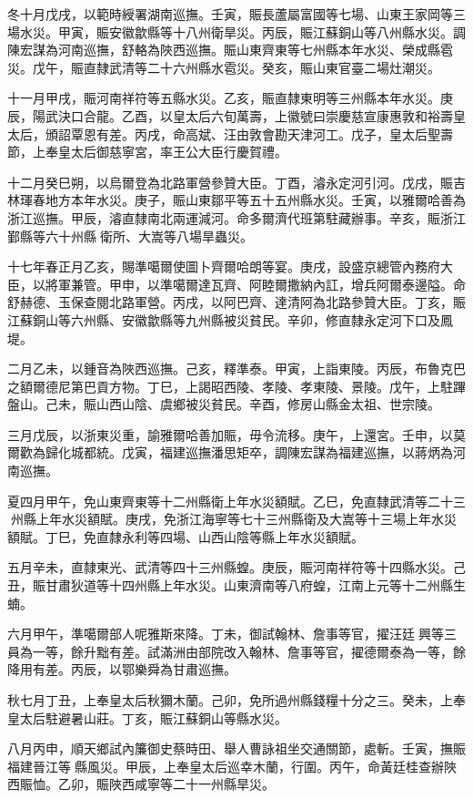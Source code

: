 \begin{pinyinscope}
冬十月戊戌，以範時綬署湖南巡撫。壬寅，賑長蘆屬富國等七場、山東王家岡等三場水災。甲寅，賑安徽歙縣等十八州衛旱災。丙辰，賑江蘇銅山等八州縣水災。調陳宏謀為河南巡撫，舒輅為陜西巡撫。賑山東齊東等七州縣本年水災、榮成縣雹災。戊午，賑直隸武清等二十六州縣水雹災。癸亥，賑山東官臺二場灶潮災。

十一月甲戌，賑河南祥符等五縣水災。乙亥，賑直隸東明等三州縣本年水災。庚辰，陽武決口合龍。乙酉，以皇太后六旬萬壽，上徽號曰崇慶慈宣康惠敦和裕壽皇太后，頒詔覃恩有差。丙戌，命高斌、汪由敦會勘天津河工。戊子，皇太后聖壽節，上奉皇太后御慈寧宮，率王公大臣行慶賀禮。

十二月癸巳朔，以烏爾登為北路軍營參贊大臣。丁酉，濬永定河引河。戊戌，賑吉林琿春地方本年水災。庚子，賑山東鄒平等五十五州縣水災。壬寅，以雅爾哈善為浙江巡撫。甲辰，濬直隸南北兩運減河。命多爾濟代班第駐藏辦事。辛亥，賑浙江鄞縣等六十州縣衛所、大嵩等八場旱蟲災。

十七年春正月乙亥，賜準噶爾使圖卜齊爾哈朗等宴。庚戌，設盛京總管內務府大臣，以將軍兼管。甲申，以準噶爾達瓦齊、阿睦爾撒納內訌，增兵阿爾泰邊隘。命舒赫德、玉保查閱北路軍營。丙戌，以阿巴齊、達清阿為北路參贊大臣。丁亥，賑江蘇銅山等六州縣、安徽歙縣等九州縣被災貧民。辛卯，修直隸永定河下口及鳳堤。

二月乙未，以鍾音為陜西巡撫。己亥，釋準泰。甲寅，上詣東陵。丙辰，布魯克巴之額爾德尼第巴貢方物。丁巳，上謁昭西陵、孝陵、孝東陵、景陵。戊午，上駐蹕盤山。己未，賑山西山陰、虞鄉被災貧民。辛酉，修房山縣金太祖、世宗陵。

三月戊辰，以浙東災重，諭雅爾哈善加賑，毋令流移。庚午，上還宮。壬申，以莫爾歡為歸化城都統。戊寅，福建巡撫潘思矩卒，調陳宏謀為福建巡撫，以蔣炳為河南巡撫。

夏四月甲午，免山東齊東等十二州縣衛上年水災額賦。乙巳，免直隸武清等二十三州縣上年水災額賦。庚戌，免浙江海寧等七十三州縣衛及大嵩等十三場上年水災額賦。丁巳，免直隸永利等四場、山西山陰等縣上年水災額賦。

五月辛未，直隸東光、武清等四十三州縣蝗。庚辰，賑河南祥符等十四縣水災。己丑，賑甘肅狄道等十四州縣上年水災。山東濟南等八府蝗，江南上元等十二州縣生蝻。

六月甲午，準噶爾部人呢雅斯來降。丁未，御試翰林、詹事等官，擢汪廷興等三員為一等，餘升黜有差。試滿洲由部院改入翰林、詹事等官，擢德爾泰為一等，餘降用有差。丙辰，以鄂樂舜為甘肅巡撫。

秋七月丁丑，上奉皇太后秋獮木蘭。己卯，免所過州縣錢糧十分之三。癸未，上奉皇太后駐避暑山莊。丁亥，賑江蘇銅山等縣水災。

八月丙申，順天鄉試內簾御史蔡時田、舉人曹詠祖坐交通關節，處斬。壬寅，撫賑福建晉江等縣風災。甲辰，上奉皇太后巡幸木蘭，行圍。丙午，命黃廷桂查辦陜西賑恤。乙卯，賑陜西咸寧等二十一州縣旱災。


\end{pinyinscope}

